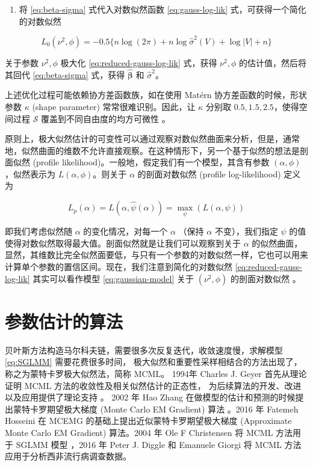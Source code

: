 \documentclass[12pt,a4paper,UTF8,twoside]{book}
\providecommand{\tightlist}{%
  \setlength{\itemsep}{0pt}\setlength{\parskip}{0pt}}
\theoremstyle{definition}
\theoremstyle{definition}
\theoremstyle{definition}
\theoremstyle{remark}
\begin{document}
\begin{enumerate}
\def\labelenumi{\arabic{enumi}.}
\setcounter{enumi}{2}
\tightlist
\item
  将 \eqref{eq:beta-sigma} 式代入对数似然函数 \eqref{eq:gauss-log-lik}
  式，可获得一个简化的对数似然
\end{enumerate}

\begin{equation}
L_{0}(\nu^2,\phi) = - 0.5\{ n\log(2\pi) + n\log \hat{\sigma}^2(V) + \log |V| + n \}
\label{eq:reduced-gauss-log-lik}
\end{equation}

关于参数 \(\nu^2,\phi\) 极大化 \eqref{eq:reduced-gauss-log-lik} 式，获得
\(\nu^2,\phi\) 的估计值，然后将其回代 \eqref{eq:beta-sigma} 式，获得
\(\hat{\boldsymbol{\beta}}\) 和 \(\hat{\sigma}^2\)。

上述优化过程可能依赖协方差函数族，如在使用 Matérn
协方差函数的时候，形状参数 \(\kappa\) (shape parameter)
常常很难识别。因此，让 \(\kappa\) 分别取 \(0.5,1.5,2.5\)，使得空间过程
\(\mathcal{S}\) 覆盖到不同自由度的均方可微性 \citep{Warnes1987}。

原则上，极大似然估计的可变性可以通过观察对数似然曲面来分析，但是，通常地，似然曲面的维数不允许直接观察。在这种情形下，另一个基于似然的想法是剖面似然
(profile likelihood)。一般地，假定我们有一个模型，其含有参数
\((\alpha,\phi)\)，似然表示为 \(L(\alpha,\phi)\)。则关于 \(\alpha\)
的剖面对数似然 (profile log-likelihood) 定义为

\begin{equation}
L_{p}(\alpha) = L(\alpha,\hat{\psi}(\alpha)) = \max_{\psi} (L(\alpha,\psi))
\label{eq:profile-log-lik}
\end{equation}

即我们考虑似然随 \(\alpha\) 的变化情况，对每一个 \(\alpha\) （保持
\(\alpha\) 不变），我们指定 \(\psi\)
的值使得对数似然取得最大值。剖面似然就是让我们可以观察到关于 \(\alpha\)
的似然曲面，显然，其维数比完全似然面要低，与只有一个参数的对数似然一样，它也可以用来计算单个参数的置信区间。现在，我们注意到简化的对数似然
\eqref{eq:reduced-gauss-log-lik} 其实可以看作模型 \eqref{eq:gaussian-model}
关于 \((\nu^2,\phi)\) 的剖面对数似然 \citep{Diggle2007}。

\hypertarget{algrithms}{%
\section{参数估计的算法}\label{algrithms}}

贝叶斯方法构造马尔科夫链，需要很多次反复迭代，收敛速度慢，求解模型
\eqref{eq:SGLMM} 需要花费很多时间，
极大似然和重要性采样相结合的方法出现了，称之为蒙特卡罗极大似然法，简称
MCML。 1994年 Charles J. Geyer 首先从理论证明 MCML
方法的收敛性及相关似然估计的正态性，
为后续算法的开发、改进以及应用提供了理论支持 \citep{Geyer1994On}。 2002
年 Hao Zhang 在做模型的估计和预测的时候提出蒙特卡罗期望极大梯度 (Monte
Carlo EM Gradient) 算法 \citep{Zhang2002On}。2016 年 Fatemeh Hosseini 在
MCEMG 的基础上提出近似蒙特卡罗期望极大梯度 (Approximate Monte Carlo EM
Gradient) 算法\citep{Hosseini2016}。2004 年 Ole F Christensen 将 MCML
方法用于 SGLMM 模型 \citep{Christensen2004}，2016 年 Peter J. Diggle 和
Emanuele Giorgi 将 MCML 方法应用于分析西非流行病调查数据。
\end{document}
